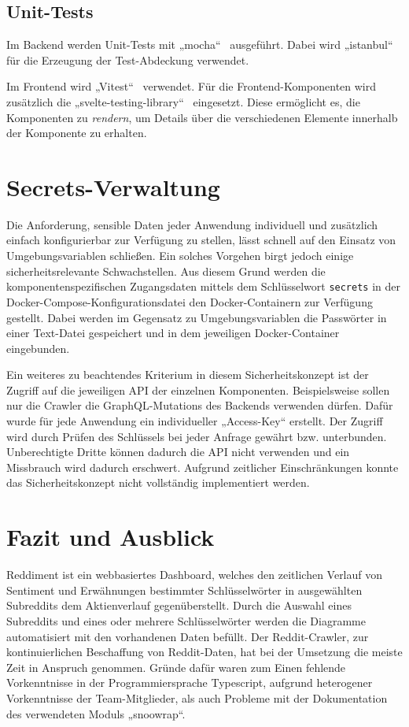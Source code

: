 \documentclass[a4paper, 10pt, conference]{IEEEtran}
\begin{document}
\subsection{Unit-Tests}

Im Backend werden Unit-Tests mit „mocha“~\cite{mochajs} ausgeführt. Dabei wird „istanbul“ \cite{istanbuljs} für die Erzeugung der Test-Abdeckung verwendet.

Im Frontend wird „Vitest“~\cite{vitest} verwendet. Für die Frontend-Komponenten wird zusätzlich die „svelte-testing-library“~ \cite{stl} eingesetzt. Diese ermöglicht es, die Komponenten zu \textit{rendern}, um Details über die verschiedenen Elemente innerhalb der Komponente zu erhalten.

\section{Secrets-Verwaltung} \label{s:secrets}

Die Anforderung, sensible Daten jeder Anwendung individuell und zusätzlich einfach konfigurierbar zur Verfügung zu stellen, lässt schnell auf den Einsatz von Umgebungsvariablen schließen. Ein solches Vorgehen birgt jedoch einige sicherheitsrelevante Schwachstellen. Aus diesem Grund werden die komponentenspezifischen Zugangsdaten mittels dem Schlüsselwort \texttt{secrets} in der Docker-Compose-Konfigurationsdatei den Docker-Containern zur Verfügung gestellt. Dabei werden im Gegensatz zu Umgebungsvariablen die Passwörter in einer Text-Datei gespeichert und in dem jeweiligen Docker-Container eingebunden.

Ein weiteres zu beachtendes Kriterium in diesem Sicherheitskonzept ist der Zugriff auf die jeweiligen API der einzelnen Komponenten. Beispielsweise sollen nur die Crawler die GraphQL-Mutations des Backends verwenden dürfen. Dafür wurde für jede Anwendung ein individueller „Access-Key“ erstellt. Der Zugriff wird durch Prüfen des Schlüssels bei jeder Anfrage gewährt bzw. unterbunden. Unberechtigte Dritte können dadurch die API nicht verwenden und ein Missbrauch wird dadurch erschwert. Aufgrund zeitlicher Einschränkungen konnte das Sicherheitskonzept nicht vollständig implementiert werden.

\section{Fazit und Ausblick} \label{s:fazit}

Reddiment ist ein webbasiertes Dashboard, welches den zeitlichen Verlauf von Sentiment und Erwähnungen bestimmter Schlüsselwörter in ausgewählten Subreddits dem Aktienverlauf gegenüberstellt. Durch die Auswahl eines Subreddits und eines oder mehrere Schlüsselwörter werden die Diagramme automatisiert mit den vorhandenen Daten befüllt.
Der Reddit-Crawler, zur kontinuierlichen Beschaffung von Reddit-Daten, hat bei der Umsetzung die meiste Zeit in Anspruch genommen. Gründe dafür waren zum Einen fehlende Vorkenntnisse in der Programmiersprache Typescript, aufgrund heterogener Vorkenntnisse der Team-Mitglieder, als auch Probleme mit der Dokumentation des verwendeten Moduls „snoowrap“. 
\end{document}
